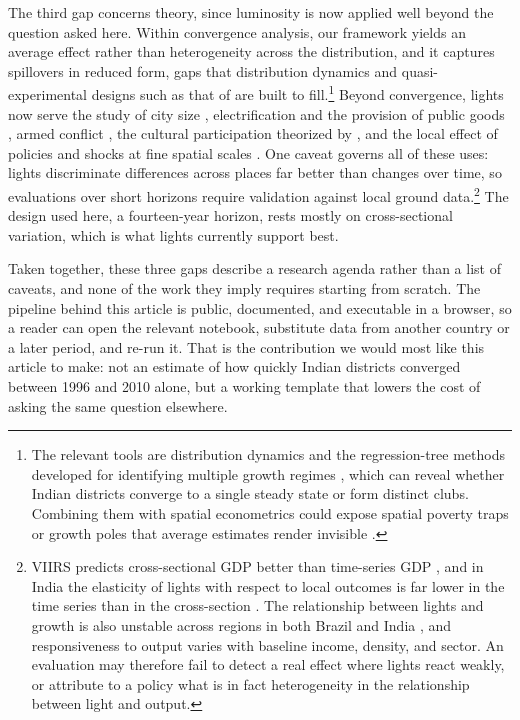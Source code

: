 \documentclass[
  a4paper, 
  twoside,
  final
]{article}
\begin{document}
The third gap concerns theory, since luminosity is now applied well
beyond the question asked here. Within convergence analysis, our
framework yields an average effect rather than heterogeneity across the
distribution, and it captures spillovers in reduced form, gaps that
distribution dynamics and quasi-experimental designs such as that of
\citet{asher_novosad_rural_roads} are built to fill.\footnote{The
  relevant tools are distribution dynamics \citep{quah_twin_peaks} and
  the regression-tree methods developed for identifying multiple growth
  regimes \citep{durlauf_johnson_convergence_clubs}, which can reveal
  whether Indian districts converge to a single steady state or form
  distinct clubs. Combining them with spatial econometrics could expose
  spatial poverty traps or growth poles that average estimates render
  invisible \citep{rey_spatial_dynamics}.} Beyond convergence, lights
now serve the study of city size \citep{ch_martin_vargas_city_size},
electrification and the provision of public goods
\citep{min_etal_electrification}, armed conflict
\citep{witmer_lights_conflict}, the cultural participation theorized by
\citet{tubadji_cultural_entropy}, and the local effect of policies and
shocks at fine spatial scales \citep{bluhm_mccord_small_geographies}.
One caveat governs all of these uses: lights discriminate differences
across places far better than changes over time, so evaluations over
short horizons require validation against local ground data.\footnote{VIIRS
  predicts cross-sectional GDP better than time-series GDP
  \citep{chen_nordhaus_viirs_crosssection}, and in India the elasticity
  of lights with respect to local outcomes is far lower in the time
  series than in the cross-section \citep{asher_shrug_india}. The
  relationship between lights and growth is also unstable across regions
  in both Brazil and India \citep{bickenbach_regional_gdp}, and
  responsiveness to output varies with baseline income, density, and
  sector. An evaluation may therefore fail to detect a real effect where
  lights react weakly, or attribute to a policy what is in fact
  heterogeneity in the relationship between light and output.} The
design used here, a fourteen-year horizon, rests mostly on
cross-sectional variation, which is what lights currently support best.

Taken together, these three gaps describe a research agenda rather than
a list of caveats, and none of the work they imply requires starting
from scratch. The pipeline behind this article is public, documented,
and executable in a browser, so a reader can open the relevant notebook,
substitute data from another country or a later period, and re-run it.
That is the contribution we would most like this article to make: not an
estimate of how quickly Indian districts converged between 1996 and 2010
alone, but a working template that lowers the cost of asking the same
question elsewhere.
\end{document}
